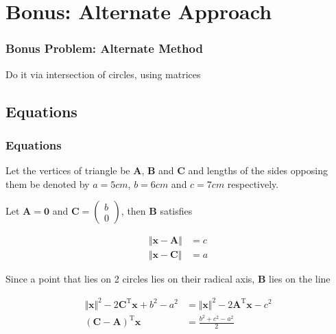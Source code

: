 \documentclass{beamer}
\theoremstyle{remark}
\newcommand{\myvec}[1]{\ensuremath{\begin{pmatrix}#1\end{pmatrix}}}
\let\vec\mathbf
\numberwithin{equation}{section}
\begin{document}
\section{Bonus: Alternate Approach}
\begin{frame}
\frametitle{Bonus Problem: Alternate Method}
Do it via intersection of circles, using matrices
\end{frame}

\subsection{Equations}
\begin{frame}
\frametitle{Equations}
	Let the vertices of triangle be $\vec{A}$, $\vec{B}$ and $\vec{C}$ and lengths of the sides opposing them be denoted by $a = 5cm$, $b = 6cm$ and $c = 7cm$ respectively.

	Let $\vec{A} = \vec{0}$ and $\vec{C} = \myvec{b \\ 0}$, then $\vec{B}$ satisfies

	\begin{align*}
		\Vert \vec{x} - \vec{A} \Vert &= c\\
		\Vert \vec{x} - \vec{C} \Vert &= a
	\end{align*}

	Since a point that lies on 2 circles lies on their radical axis, $\vec{B}$ lies on the line

	\begin{align*}
		\Vert \vec{x}\Vert^2 - 2\vec{C}^\text{T}\vec{x} + b^2 - a^2 &= \Vert \vec{x}\Vert^2 - 2\vec{A}^\text{T}\vec{x} - c^2 \\
		(\vec{C}-\vec{A})^\text{T}\vec{x} &= \frac{b^2 + c^2 - a^2}{2}
	\end{align*}
\end{frame}
\end{document}
